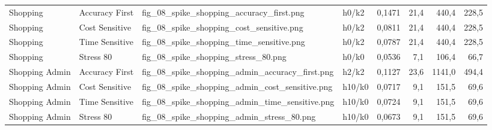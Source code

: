 \begin{longtable}{llllrrrr}
Shopping & Accuracy First & fig\_08\_spike\_shopping\_accuracy\_first.png & h0/k2 & 0,1471 & 21,4 & 440,4 & 228,5 \\
Shopping & Cost Sensitive & fig\_08\_spike\_shopping\_cost\_sensitive.png & h0/k2 & 0,0811 & 21,4 & 440,4 & 228,5 \\
Shopping & Time Sensitive & fig\_08\_spike\_shopping\_time\_sensitive.png & h0/k2 & 0,0787 & 21,4 & 440,4 & 228,5 \\
Shopping & Stress 80 & fig\_08\_spike\_shopping\_stress\_80.png & h0/k0 & 0,0536 & 7,1 & 106,4 & 66,7 \\
Shopping Admin & Accuracy First & fig\_08\_spike\_shopping\_admin\_accuracy\_first.png & h2/k2 & 0,1127 & 23,6 & 1141,0 & 494,4 \\
Shopping Admin & Cost Sensitive & fig\_08\_spike\_shopping\_admin\_cost\_sensitive.png & h10/k0 & 0,0717 & 9,1 & 151,5 & 69,6 \\
Shopping Admin & Time Sensitive & fig\_08\_spike\_shopping\_admin\_time\_sensitive.png & h10/k0 & 0,0724 & 9,1 & 151,5 & 69,6 \\
Shopping Admin & Stress 80 & fig\_08\_spike\_shopping\_admin\_stress\_80.png & h10/k0 & 0,0673 & 9,1 & 151,5 & 69,6 \\
\end{longtable}
